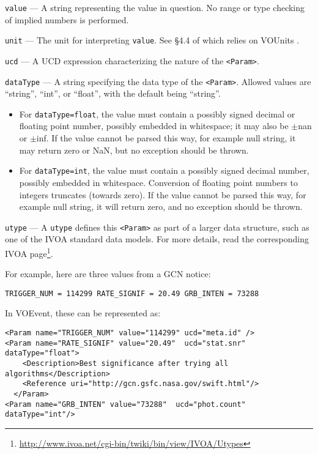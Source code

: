 \documentclass[11pt,a4paper]{ivoa}
\begin{document}
 \texttt{value}\label{sec:3.3.1.2} --- A string representing 
the value in question. No range or type checking of implied numbers is 
performed. 

 \texttt{unit}\label{sec:3.3.1.3} --- The unit for 
interpreting \texttt{value}. See \S4.4 of \citep{2019ivoa.spec.1021O}
which relies on VOUnits \citep{2014ivoa.spec.0523D}.

 \texttt{ucd}\label{sec:3.3.1.4} --- A UCD 
\citep{2018ivoa.spec.0527P}
expression characterizing the nature of the \texttt{<Param>}. 

 \texttt{dataType}\label{sec:3.3.1.5} --- A string specifying 
the data type of the \texttt{<Param>}. Allowed values are ``string'', ``int'', or 
``float'', with the default being ``string''. 
\begin{itemize}
\item For \texttt{dataType=float}, the value must contain a possibly signed decimal 
or floating point number, possibly embedded in whitespace; it may also be 
$\pm$nan or $\pm$inf. If the value cannot be parsed this way, for example null 
string, it may return zero or NaN, but no exception should be thrown.
\item For \texttt{dataType=int}, the value must contain a possibly signed decimal 
number, possibly embedded in whitespace. Conversion of floating point numbers to 
integers truncates (towards zero). If the value cannot be parsed this way, for 
example null string, it will return zero, and no exception should be thrown.
\end{itemize}

 \texttt{utype}\label{sec:3.3.1.6} --- A \texttt{utype} defines 
this \texttt{<Param>} as part of a larger data structure, such as one of the IVOA 
standard data models. For more details, read the corresponding IVOA 
page\footnote{\url{http://www.ivoa.net/cgi-bin/twiki/bin/view/IVOA/Utypes}}. 

For example, here are three values from a GCN \citep{bib04} notice:
\begin{lstlisting}
TRIGGER_NUM = 114299 RATE_SIGNIF = 20.49 GRB_INTEN = 73288
\end{lstlisting}

In VOEvent, these can be represented as:
\begin{lstlisting}
<Param name="TRIGGER_NUM" value="114299" ucd="meta.id" />
<Param name="RATE_SIGNIF" value="20.49"  ucd="stat.snr" dataType="float">
    <Description>Best significance after trying all algorithms</Description>
    <Reference uri="http://gcn.gsfc.nasa.gov/swift.html"/>
  </Param>
<Param name="GRB_INTEN" value="73288"  ucd="phot.count" dataType="int"/>
\end{lstlisting}
\end{document}
